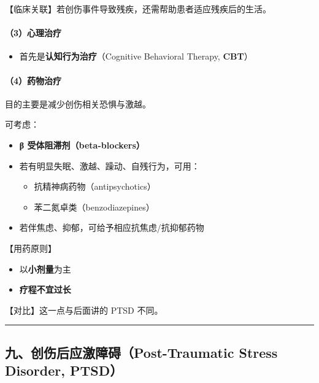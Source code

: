 \documentclass[
  chinese,
  9pt,
  a4paper,
]{ctexart}
\providecommand{\tightlist}{%
  \setlength{\itemsep}{0pt}\setlength{\parskip}{0pt}}
\begin{document}
【临床关联】若创伤事件导致残疾，还需帮助患者适应残疾后的生活。

\paragraph{（3）心理治疗}\label{ux5fc3ux7406ux6cbbux7597}

\begin{itemize}
\tightlist
\item
  首先是\textbf{认知行为治疗}（Cognitive Behavioral Therapy,
  \textbf{CBT}）
\end{itemize}

\paragraph{（4）药物治疗}\label{ux836fux7269ux6cbbux7597}

目的主要是减少创伤相关恐惧与激越。

可考虑：

\begin{itemize}
\item
  \textbf{β 受体阻滞剂（beta-blockers）}
\item
  若有明显失眠、激越、躁动、自残行为，可用：

  \begin{itemize}
  \tightlist
  \item
    抗精神病药物（antipsychotics）
  \item
    苯二氮卓类（benzodiazepines）
  \end{itemize}
\item
  若伴焦虑、抑郁，可给予相应抗焦虑/抗抑郁药物
\end{itemize}

【用药原则】

\begin{itemize}
\tightlist
\item
  以\textbf{小剂量}为主
\item
  \textbf{疗程不宜过长}
\end{itemize}

【对比】这一点与后面讲的 PTSD 不同。

\begin{center}\rule{0.5\linewidth}{0.5pt}\end{center}

\subsection{九、创伤后应激障碍（Post-Traumatic Stress Disorder,
PTSD）}\label{ux4e5dux521bux4f24ux540eux5e94ux6fc0ux969cux788dpost-traumatic-stress-disorder-ptsd}
\end{document}
